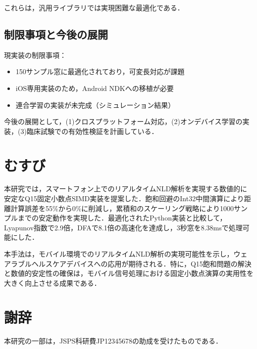 \documentclass[paper]{ieice}
\begin{document}
これらは，汎用ライブラリでは実現困難な最適化である．

\subsection{制限事項と今後の展開}

現実装の制限事項：
\begin{itemize}
\item 150サンプル窓に最適化されており，可変長対応が課題
\item iOS専用実装のため，Android NDKへの移植が必要
\item 連合学習の実装が未完成（シミュレーション結果）
\end{itemize}

今後の展開として，(1)クロスプラットフォーム対応，(2)オンデバイス学習の実装，(3)臨床試験での有効性検証を計画している．

\section{むすび}

本研究では，スマートフォン上でのリアルタイムNLD解析を実現する数値的に安定なQ15固定小数点SIMD実装を提案した．飽和回避のInt32中間演算により距離計算誤差を55\%から0\%に削減し，累積和のスケーリング戦略により1000サンプルまでの安定動作を実現した．最適化されたPython実装と比較して，Lyapunov指数で2.9倍，DFAで8.1倍の高速化を達成し，3秒窓を8.38msで処理可能にした．

本手法は，モバイル環境でのリアルタイムNLD解析の実現可能性を示し，ウェアラブルヘルスケアデバイスへの応用が期待される．特に，Q15飽和問題の解決と数値的安定性の確保は，モバイル信号処理における固定小数点演算の実用性を大きく向上させる成果である．

\section*{謝辞}
本研究の一部は，JSPS科研費JP12345678の助成を受けたものである．
\end{document}
